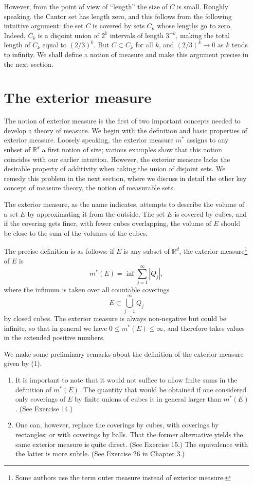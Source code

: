 \documentclass[11pt,openany]{book}
\begin{document}
However, from the point of view of ``length'' the size of $C$ is small. Roughly speaking, the Cantor set has length zero, and this follows from the following intuitive argument: the set $C$ is covered by sets $C_k$ whose lengths go to zero. Indeed, $C_k$ is a disjoint union of $2^k$ intervals of length $3^{-k}$, making the total length of $C_k$ equal to $(2/3)^k$. But $C\subset C_k$ for all $k$, and $(2/3)^k\to0$ as $k$ tends to infinity. We shall define a notion of measure and make this argument precise in the next section.

\section{The exterior measure}

The notion of exterior measure is the first of two important concepts needed to develop a theory of measure. We begin with the definition and basic properties of exterior measure. Loosely speaking, the exterior measure $m^*$ assigns to any subset of $\mathbb{R}^d$ a first notion of size; various examples show that this notion coincides with our earlier intuition. However, the exterior measure lacks the desirable property of additivity when taking the union of disjoint sets. We remedy this problem in the next section, where we discuss in detail the other key concept of measure theory, the notion of measurable sets.

The exterior measure, as the name indicates, attempts to describe the volume of a set $E$ by approximating it from the outside. The set $E$ is covered by cubes, and if the covering gets finer, with fewer cubes overlapping, the volume of $E$ should be close to the sum of the volumes of the cubes.

The precise definition is as follows: if $E$ is any subset of $\mathbb{R}^d$, the exterior measure\footnote{Some authors use the term outer measure instead of exterior measure.} of $E$ is
\begin{equation}
 m^*(E)=\inf\sum_{j=1}^{\infty}|Q_j|,
 \tag{1}
\end{equation}
where the infimum is taken over all countable coverings
\[
 E\subset\bigcup_{j=1}^{\infty}Q_j
\]
by closed cubes. The exterior measure is always non-negative but could be infinite, so that in general we have $0\le m^*(E)\le\infty$, and therefore takes values in the extended positive numbers.

We make some preliminary remarks about the definition of the exterior measure given by (1).
\begin{enumerate}
\item[(i)] It is important to note that it would not suffice to allow finite sums in the definition of $m^*(E)$. The quantity that would be obtained if one considered only coverings of $E$ by finite unions of cubes is in general larger than $m^*(E)$. (See Exercise 14.)
\item[(ii)] One can, however, replace the coverings by cubes, with coverings by rectangles; or with coverings by balls. That the former alternative yields the same exterior measure is quite direct. (See Exercise 15.) The equivalence with the latter is more subtle. (See Exercise 26 in Chapter 3.)
\end{enumerate}
\end{document}

